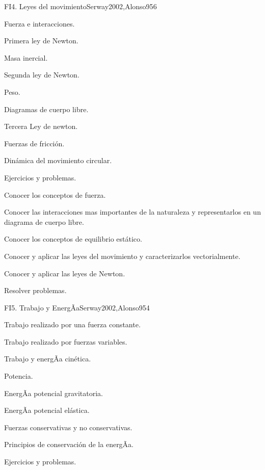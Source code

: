 \begin{syllabus}
\begin{unit}{FI4. Leyes del movimiento}{Serway2002,Alonso95}{6}
\begin{topics}
      \item Fuerza e interacciones.
      \item Primera ley de Newton.
      \item Masa inercial.
      \item Segunda ley de Newton.
      \item Peso.
      \item Diagramas de cuerpo libre.
      \item Tercera Ley de newton.
      \item Fuerzas de fricción.
      \item Dinámica del movimiento circular.
      \item Ejercicios y problemas.
   \end{topics}

   \begin{unitgoals}
      \item Conocer los conceptos de fuerza.
      \item Conocer las interacciones mas importantes de la naturaleza y representarlos en un diagrama de cuerpo libre.
      \item Conocer los conceptos de equilibrio estático.
      \item Conocer y aplicar las leyes del movimiento y caracterizarlos vectorialmente.
      \item Conocer y aplicar las leyes de Newton.
      \item Resolver problemas.
   \end{unitgoals}
\end{unit}

\begin{unit}{FI5. Trabajo y EnergÃ­a}{Serway2002,Alonso95}{4}
\begin{topics}
	\item Trabajo realizado por una fuerza constante.
	\item Trabajo realizado por fuerzas variables.
	\item Trabajo y energÃ­a cinética.
	\item Potencia.
	\item EnergÃ­a potencial gravitatoria.
	\item EnergÃ­a potencial elástica.
	\item Fuerzas conservativas y no conservativas.
	\item Principios de conservación de la energÃ­a.
	\item Ejercicios y problemas.
\end{topics}


\end{unit}
\end{syllabus}
